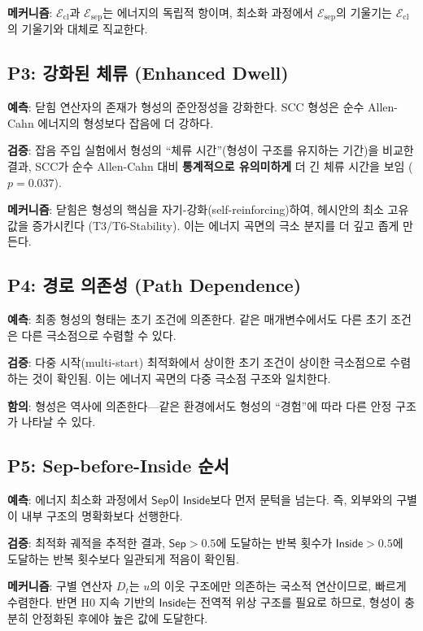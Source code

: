 \textbf{메커니즘}: $\mathcal{E}_{\mathrm{cl}}$과 $\mathcal{E}_{\mathrm{sep}}$는 에너지의 독립적 항이며, 최소화 과정에서 $\mathcal{E}_{\mathrm{sep}}$의 기울기는 $\mathcal{E}_{\mathrm{cl}}$의 기울기와 대체로 직교한다.

\subsection{P3: 강화된 체류 (Enhanced Dwell)}

\textbf{예측}: 닫힘 연산자의 존재가 형성의 준안정성을 강화한다. SCC 형성은 순수 Allen-Cahn 에너지의 형성보다 잡음에 더 강하다.

\textbf{검증}: 잡음 주입 실험에서 형성의 ``체류 시간''(형성이 구조를 유지하는 기간)을 비교한 결과, SCC가 순수 Allen-Cahn 대비 \textbf{통계적으로 유의미하게} 더 긴 체류 시간을 보임 ($p = 0.037$).

\textbf{메커니즘}: 닫힘은 형성의 핵심을 자기-강화(self-reinforcing)하여, 헤시안의 최소 고유값을 증가시킨다 (T3/T6-Stability). 이는 에너지 곡면의 극소 분지를 더 깊고 좁게 만든다.

\subsection{P4: 경로 의존성 (Path Dependence)}

\textbf{예측}: 최종 형성의 형태는 초기 조건에 의존한다. 같은 매개변수에서도 다른 초기 조건은 다른 극소점으로 수렴할 수 있다.

\textbf{검증}: 다중 시작(multi-start) 최적화에서 상이한 초기 조건이 상이한 극소점으로 수렴하는 것이 확인됨. 이는 에너지 곡면의 다중 극소점 구조와 일치한다.

\textbf{함의}: 형성은 역사에 의존한다---같은 환경에서도 형성의 ``경험''에 따라 다른 안정 구조가 나타날 수 있다.

\subsection{P5: Sep-before-Inside 순서}

\textbf{예측}: 에너지 최소화 과정에서 $\mathsf{Sep}$이 $\mathsf{Inside}$보다 먼저 문턱을 넘는다. 즉, 외부와의 구별이 내부 구조의 명확화보다 선행한다.

\textbf{검증}: 최적화 궤적을 추적한 결과, $\mathsf{Sep} > 0.5$에 도달하는 반복 횟수가 $\mathsf{Inside} > 0.5$에 도달하는 반복 횟수보다 일관되게 적음이 확인됨.

\textbf{메커니즘}: 구별 연산자 $D_t$는 $u$의 이웃 구조에만 의존하는 국소적 연산이므로, 빠르게 수렴한다. 반면 H0 지속 기반의 $\mathsf{Inside}$는 전역적 위상 구조를 필요로 하므로, 형성이 충분히 안정화된 후에야 높은 값에 도달한다.

